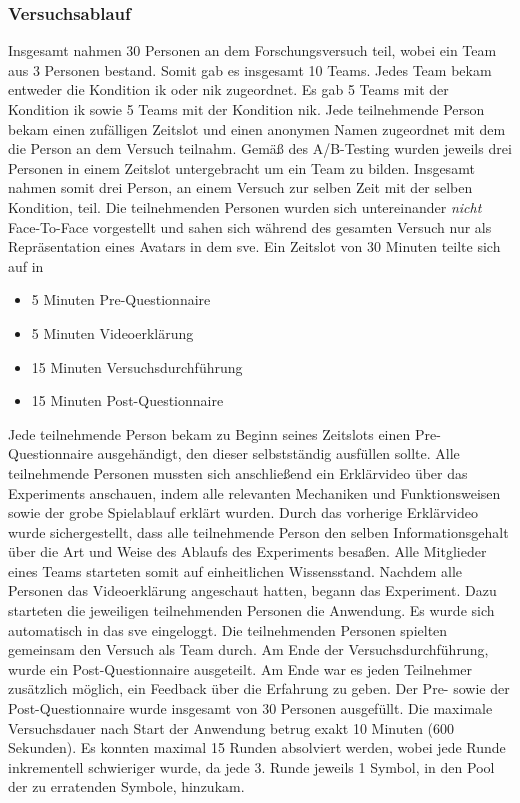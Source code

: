 \documentclass[a4paper,11pt]{article}%
\renewcommand{\\}{\vspace*{0.5\baselineskip} \newline}
\begin{document}
	\subsubsection{Versuchsablauf}
Insgesamt nahmen 30 Personen an dem Forschungsversuch teil, wobei ein Team aus 3 Personen bestand. Somit gab es insgesamt 10 Teams. Jedes Team bekam entweder die Kondition \ac{ik} oder \ac{nik} zugeordnet. Es gab 5 Teams mit der Kondition \ac{ik} sowie 5 Teams mit der Kondition \ac{nik}.
Jede teilnehmende Person bekam einen zufälligen Zeitslot und einen anonymen Namen zugeordnet mit dem die Person an dem Versuch teilnahm. Gemäß des A/B-Testing wurden jeweils drei Personen in einem Zeitslot untergebracht um ein \dq{}Team\dq{} zu bilden.
Insgesamt nahmen somit drei Person, an einem Versuch zur selben Zeit mit der selben Kondition, teil. Die teilnehmenden Personen wurden sich untereinander \textit{nicht} Face-To-Face vorgestellt und sahen sich während des gesamten Versuch nur als Repräsentation eines Avatars in dem \ac{sve}. 
Ein Zeitslot von 30 Minuten teilte sich auf in
		\begin{itemize}
			\item 5 Minuten Pre-Questionnaire
			\item 5 Minuten Videoerklärung
			\item 15 Minuten Versuchsdurchführung
			\item 15 Minuten Post-Questionnaire
		\end{itemize}
Jede teilnehmende Person bekam zu Beginn seines Zeitslots einen Pre-Questionnaire ausgehändigt, den dieser selbstständig ausfüllen sollte.
Alle teilnehmende Personen mussten sich anschließend ein Erklärvideo über das Experiments anschauen, indem alle relevanten Mechaniken und Funktionsweisen sowie der grobe Spielablauf erklärt wurden. Durch das vorherige Erklärvideo wurde sichergestellt, dass alle teilnehmende Person den selben Informationsgehalt über die Art und Weise des Ablaufs des Experiments besaßen. Alle Mitglieder eines Teams starteten somit auf einheitlichen Wissensstand.
Nachdem alle Personen das Videoerklärung angeschaut hatten, begann das Experiment. Dazu starteten die jeweiligen teilnehmenden Personen die Anwendung. Es wurde sich automatisch in das \ac{sve} eingeloggt. Die teilnehmenden Personen spielten gemeinsam den Versuch als Team durch.
	Am Ende der Versuchsdurchführung, wurde ein Post-Questionnaire ausgeteilt.  Am Ende war es jeden Teilnehmer zusätzlich möglich, ein Feedback über die Erfahrung zu geben. Der Pre- sowie der Post-Questionnaire wurde insgesamt von 30 Personen ausgefüllt. 
Die maximale Versuchsdauer nach Start der Anwendung betrug exakt 10 Minuten (600 Sekunden). Es konnten maximal 15 Runden absolviert werden, wobei jede Runde inkrementell schwieriger wurde, da jede 3. Runde jeweils 1 Symbol, in den Pool der zu erratenden Symbole, hinzukam. 
\end{document}

